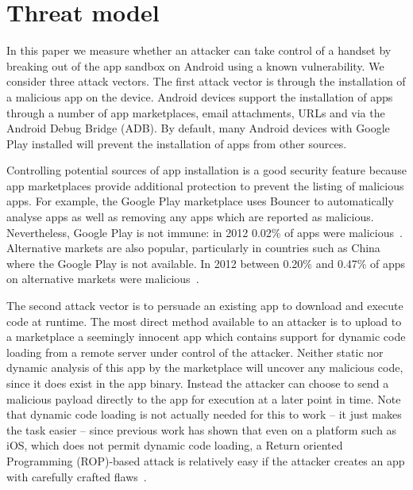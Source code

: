 \documentclass{llncs}
\begin{document}
\section{Threat model}
\label{sec:threatmodel}

In this paper we measure whether an attacker can take control of a handset by breaking out of the app sandbox on Android using a known vulnerability.
We consider three attack vectors.
The first attack vector is through the installation of a malicious app on the device.
Android devices support the installation of apps through a number of app marketplaces, email attachments, URLs and via the Android Debug Bridge (ADB).
By default, many Android devices with Google Play installed will prevent the installation of apps from other sources.

Controlling potential sources of app installation is a good security feature because app marketplaces provide additional protection to prevent the listing of malicious apps.
For example, the Google Play marketplace uses Bouncer to automatically analyse apps as well as removing any apps which are reported as malicious.
Nevertheless, Google Play is not immune: in 2012 0.02\% of apps were malicious~\cite{Zhou2012a}.
Alternative markets are also popular, particularly in countries such as China where the Google Play is not available. 
In 2012 between 0.20\% and 0.47\% of apps on alternative markets were malicious~\cite{Zhou2012a}.

The second attack vector is to persuade an existing app to download and execute code at runtime.
The most direct method available to an attacker is to upload to a marketplace a seemingly innocent app which contains support for dynamic code loading from a remote server under control of the attacker.
Neither static nor dynamic analysis of this app by the marketplace will uncover any malicious code, since it does exist in the app binary.
Instead the attacker can choose to send a malicious payload directly to the app for execution at a later point in time.
Note that dynamic code loading is not actually needed for this to work -- it just makes the task easier -- since previous work has shown that even on a platform such as iOS, which does not permit dynamic code loading, a Return oriented Programming (ROP)-based attack is relatively easy if the attacker creates an app with carefully crafted flaws~\cite{Wang2013a}.
\end{document}
